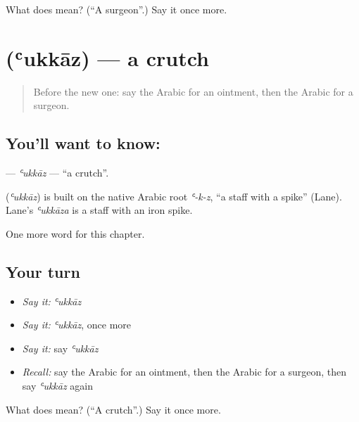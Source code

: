\begin{tcolorbox}[breakable,colback=teal!4,colframe=teal!35!black,title={Before you move on}]
What does  mean? (\textquotedblleft{}A surgeon\textquotedblright{}.) Say it once more.
\end{tcolorbox}
\section[\texorpdfstring{\ar{عكاز} (ʿukkāz)}{عكاز (ʿukkāz)}]{ (ʿukkāz) — a crutch}

\label{lesson:AR-C232-ukkaz}



\begin{quote}
Before the new one: say the Arabic for an ointment, then the Arabic for a surgeon.
\end{quote}

\subsection*{You'll want to know: }
\textbf{} — \emph{ʿukkāz} — \textquotedblleft{}a crutch\textquotedblright{}.

\begin{cousinweb}
\textbf{} (\emph{ʿukkāz}) is built on the native Arabic root \emph{ʿ-k-z}, \textquotedblleft{}a staff with a spike\textquotedblright{} (Lane). Lane's \emph{ʿukkāza} is a staff with an iron spike.
\end{cousinweb}

\begin{grammarlens}[title={What you've built}]
One more word for this chapter.
\end{grammarlens}

\subsection*{Your turn}
\begin{itemize}
\raggedright
  \item \emph{Say it:} \emph{ʿukkāz}
  \item \emph{Say it:} \emph{ʿukkāz}, once more
  \item \emph{Say it:} say \emph{ʿukkāz}
  \item \emph{Recall:} say the Arabic for an ointment, then the Arabic for a surgeon, then say \emph{ʿukkāz} again
\end{itemize}

\begin{tcolorbox}[breakable,colback=teal!4,colframe=teal!35!black,title={Before you move on}]
What does  mean? (\textquotedblleft{}A crutch\textquotedblright{}.) Say it once more.
\end{tcolorbox}
